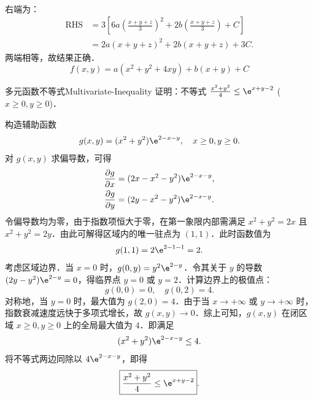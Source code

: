 \begin{solution}
\begin{equation}
\begin{aligned}
        \end{aligned}
    \end{equation}
    右端为：
    \begin{equation}
        \begin{aligned}
            \text{RHS} & = 3 \left[ 6a \left( \frac{x+y+z}{3} \right)^2 + 2b \left( \frac{x+y+z}{3} \right) + C \right] \\
                       & = 2a(x+y+z)^2 + 2b(x+y+z) + 3C.
        \end{aligned}
    \end{equation}
    两端相等，故结果正确．
    \begin{equation}
        \boxed{f(x,y) = a(x^2 + y^2 + 4xy) + b(x + y) + C}
    \end{equation}
\end{solution}


\begin{problem}{多元函数不等式}{Multivariate-Inequality}
    证明：不等式 $\frac{x^2+y^2}{4} \le \e^{x+y-2}$ ($x \ge 0, y \ge 0$)．
\end{problem}

\begin{myproof}
    构造辅助函数
    \begin{equation}
        g(x, y) = (x^2 + y^2) \e^{2-x-y}, \quad x \ge 0, y \ge 0.
    \end{equation}
    对 $g(x, y)$ 求偏导数，可得
    \begin{equation}
        \begin{aligned}
            \frac{\partial g}{\partial x} & = (2x - x^2 - y^2) \e^{2-x-y}, \\
            \frac{\partial g}{\partial y} & = (2y - x^2 - y^2) \e^{2-x-y}.
        \end{aligned}
    \end{equation}
    令偏导数均为零，由于指数项恒大于零，在第一象限内部需满足 $x^2 + y^2 = 2x$ 且 $x^2 + y^2 = 2y$．由此可解得区域内的唯一驻点为 $(1, 1)$．此时函数值为
    \begin{equation}
        g(1, 1) = 2 \e^{2-1-1} = 2.
    \end{equation}
    考虑区域边界．当 $x = 0$ 时，$g(0, y) = y^2 \e^{2-y}$．令其关于 $y$ 的导数 $(2y - y^2) \e^{2-y} = 0$，得临界点 $y = 0$ 或 $y = 2$．计算边界上的极值点：
    \begin{equation}
        g(0, 0) = 0, \quad g(0, 2) = 4.
    \end{equation}
    对称地，当 $y = 0$ 时，最大值为 $g(2, 0) = 4$．由于当 $x \to +\infty$ 或 $y \to +\infty$ 时，指数衰减速度远快于多项式增长，故 $g(x, y) \to 0$．综上可知，$g(x, y)$ 在闭区域 $x \ge 0, y \ge 0$ 上的全局最大值为 $4$．即满足
    \begin{equation}
        (x^2 + y^2) \e^{2-x-y} \le 4.
    \end{equation}
    将不等式两边同除以 $4\e^{2-x-y}$，即得
    \begin{equation}
        \boxed{\frac{x^2+y^2}{4} \le \e^{x+y-2}}.
    \end{equation}
\end{myproof}


